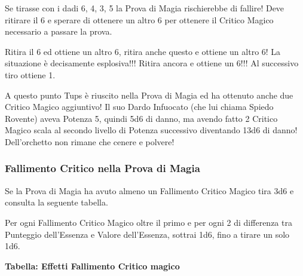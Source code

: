 \documentclass[a4paper,twoside,openany]{book}
\begin{document}
\begin{multicols}{2}
Se tirasse con i dadi 6, 4, 3, 5 la Prova di Magia rischierebbe di fallire! Deve ritirare il 6 e sperare di ottenere un altro 6 per ottenere il Critico Magico necessario a passare la prova.

Ritira il 6 ed ottiene un altro 6, ritira anche questo e ottiene un altro 6! La situazione è decisamente esplosiva!!! Ritira ancora e ottiene un 6!!! Al successivo tiro ottiene 1.

A questo punto Tups è riuscito nella Prova di Magia ed ha ottenuto anche due Critico Magico aggiuntivo! Il suo Dardo Infuocato (che lui chiama Spiedo Rovente) aveva Potenza 5, quindi 5d6 di danno, ma avendo fatto 2 Critico Magico scala al secondo livello di Potenza successivo diventando 13d6 di danno!
Dell'orchetto non rimane che cenere e polvere!


\subsubsection{Fallimento Critico nella Prova di Magia}\label{magiefallimentocriticonellaprovadimagia}

Se la Prova di Magia ha avuto almeno un Fallimento Critico Magico tira 3d6 e consulta la seguente tabella.

Per ogni Fallimento Critico Magico oltre il primo e per ogni 2 di differenza tra Punteggio dell'Essenza e Valore dell'Essenza, sottrai 1d6, fino a tirare un solo 1d6.


\textbf{Tabella: Effetti Fallimento Critico magico}


\end{multicols}
\end{document}

